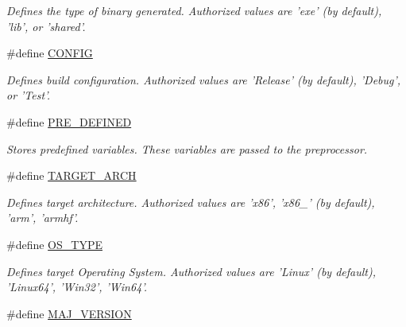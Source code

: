 \begin{DoxyCompactItemize}
\begin{DoxyCompactList}\small\item\em Defines the type of binary generated. Authorized values are 'exe' (by default), 'lib', or 'shared'. \end{DoxyCompactList}\item 
\hypertarget{group___build___variables_ga76ea3cf49247a07c54b3db005a3c7f57}{\#define \hyperlink{group___build___variables_ga76ea3cf49247a07c54b3db005a3c7f57}{C\+O\+N\+F\+I\+G}}\label{group___build___variables_ga76ea3cf49247a07c54b3db005a3c7f57}

\begin{DoxyCompactList}\small\item\em Defines build configuration. Authorized values are 'Release' (by default), 'Debug', or 'Test'. \end{DoxyCompactList}\item 
\hypertarget{group___build___variables_gab6ba1c81d5eb93f6cbcd77db8797b5ad}{\#define \hyperlink{group___build___variables_gab6ba1c81d5eb93f6cbcd77db8797b5ad}{P\+R\+E\+\_\+\+D\+E\+F\+I\+N\+E\+D}}\label{group___build___variables_gab6ba1c81d5eb93f6cbcd77db8797b5ad}

\begin{DoxyCompactList}\small\item\em Stores predefined variables. These variables are passed to the preprocessor. \end{DoxyCompactList}\item 
\hypertarget{group___build___variables_ga4039b19fe99a211262e1b3a58314a4cb}{\#define \hyperlink{group___build___variables_ga4039b19fe99a211262e1b3a58314a4cb}{T\+A\+R\+G\+E\+T\+\_\+\+A\+R\+C\+H}}\label{group___build___variables_ga4039b19fe99a211262e1b3a58314a4cb}

\begin{DoxyCompactList}\small\item\em Defines target architecture. Authorized values are 'x86', 'x86\+\_' (by default), 'arm', 'armhf'. \end{DoxyCompactList}\item 
\hypertarget{group___build___variables_gac49cbbb3d31529b75c2490af64e52695}{\#define \hyperlink{group___build___variables_gac49cbbb3d31529b75c2490af64e52695}{O\+S\+\_\+\+T\+Y\+P\+E}}\label{group___build___variables_gac49cbbb3d31529b75c2490af64e52695}

\begin{DoxyCompactList}\small\item\em Defines target Operating System. Authorized values are 'Linux' (by default), 'Linux64', 'Win32', 'Win64'. \end{DoxyCompactList}\item 
\hypertarget{group___build___variables_ga0811dc6fc274184efa103eab807a0989}{\#define \hyperlink{group___build___variables_ga0811dc6fc274184efa103eab807a0989}{M\+A\+J\+\_\+\+V\+E\+R\+S\+I\+O\+N}}\label{group___build___variables_ga0811dc6fc274184efa103eab807a0989}


\end{DoxyCompactItemize}
